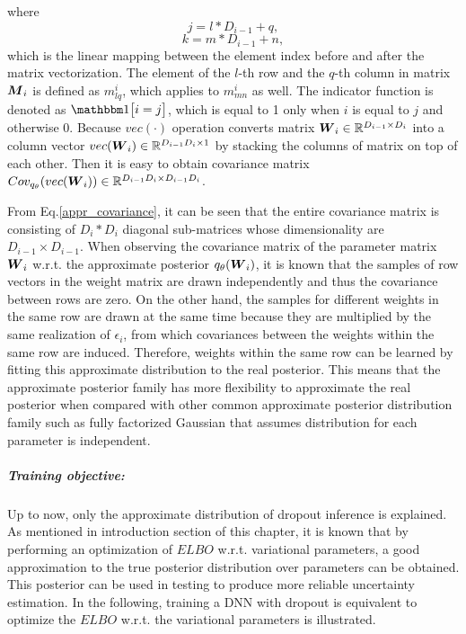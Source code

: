 where 
\[ j = l*D_{i-1} + q,\]
\[ k = m*D_{i-1} + n,\]
which is the linear mapping between the element index before and after the matrix vectorization. The element of the $l$-th row and the $q$-th column in matrix $\boldsymbol M_{i}$ is defined as $m^{i}_{lq}$, which applies to $m^{i}_{mn}$ as well. 
The indicator function is denoted as $\mathbbm 1 \big[i=j\big]$, which is equal to 1 only when $i$ is equal to $j$ and otherwise 0. Because $vec(\cdot)$ operation converts matrix $\boldsymbol W_{i} \in \mathbb R^{D_{i-1} \times D_{i}}$ into a column vector $ vec(\boldsymbol W_{i}) \in \mathbb R^{D_{i-1}D_{i} \times 1}$ by stacking the columns of matrix on top of each other. Then it is easy to obtain covariance matrix $Cov_{q_{\theta}}(vec(\boldsymbol W_{i})) \in \mathbb R^{D_{i-1}D_{i} \times D_{i-1}D_{i}} $. 

From Eq.\ref{appr_covariance}, it can be seen that the entire covariance matrix is consisting of $D_{i} \ast D_{i}$ diagonal sub-matrices whose dimensionality are $D_{i-1} \times D_{i-1}$.
When observing the covariance matrix of the parameter matrix $\boldsymbol W_{i}$ w.r.t. the approximate posterior $q_{\theta}({\boldsymbol W_{i}})$, it is known that the samples of row vectors in the weight matrix are drawn independently and thus the covariance between rows are zero. On the other hand, the samples for different weights in the same row are drawn at the same time because they are multiplied by the same realization of $\epsilon_{i}$, from which covariances between the weights within the same row are induced. Therefore, weights within the same row can be learned by fitting this approximate distribution to the real posterior. This means that the approximate posterior family has more flexibility to approximate the real posterior when compared with other common approximate posterior distribution family such as fully factorized Gaussian that assumes distribution for each parameter is independent.


\subparagraph{Training objective:} Up to now, only the approximate distribution of dropout inference is explained. As mentioned in introduction section of this chapter, it is known that by performing an optimization of $ELBO$ w.r.t. variational parameters, a good approximation to the true posterior distribution over parameters can be obtained. This posterior can be used in testing to produce more reliable uncertainty estimation. 
In the following, training a DNN with dropout is equivalent to optimize the $ELBO$ w.r.t. the variational parameters is illustrated.

